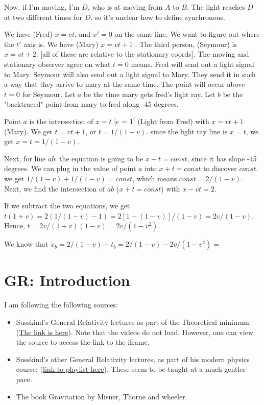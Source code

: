 \documentclass[11pt]{book}
\begin{document}
Now, if I'm moving, I'm $D$, who is at moving from $A$ to $B$. The light
reaches $D$ at two different times for $D$. so it's unclear how to define
synchronous.


We have (Fred) $x = vt$, and $x' = 0$ on the same line. We want to figure out
where the $t'$ axis is. We have (Mary) $x = vt + 1$ . The
third person, (Seymour) is $x = vt + 2$. [all of these are relative to the stationary coords].
The moving and stationary observer agree on what $t = 0$ means. Fred will
send out a light signal to Mary. Seymour will also send out a light signal
to Mary. They send it in such a way that they arrive to mary at the same
time. The point will occur above $t = 0$ for Seymour. Let $a$ be the
time mary gets fred's light ray. Let $b$ be the "backtraced" point from
mary to fred along -45 degrees.

Point $a$ is the intersection of $x = t$ [c = 1] (Light from Fred) 
with $x = vt + 1$ (Mary). We get $t = vt + 1$, or $t = 1/(1-v)$. since
the light ray line is $x = t$, we get $x = t = 1/(1-v)$.

Next, for line $ab$: the equation is going to be $x + t = const$, since it
has slope -45 degrees. We can plug in the value of point $a$ into $x +t = const$
to discover $const$. we get $1/(1-v) + 1/(1-v) = const$, which means
$const = 2/(1-v)$. Next, we find the intersection of $ab$ ($x+t = const$)
with $x - vt = 2$.

If we subtract the two equations, we get
$t(1+v) = 2(1/(1-v) - 1) = 2[1 - (1-v)]/(1-v) = 2v/(1-v)$.
Hence, $t = 2v/(1+v)(1-v) = 2v/(1-v^2)$.

We know that $x_b = 2/(1-v) - t_b = 2/(1-v) - 2v/(1-v^2) = $
\chapter{GR: Introduction}

I am following the following sources:

\begin{itemize}
    \item Susskind's General Relativity lectures as part of the Theoretical
        minimum: (\href{https://theoreticalminimum.com/courses/general-relativity/}{The link is here}).
        Note that the videos do not load. However, one can view the source to access the link
        to the iframe.
    \item Susskind's other General Relativity lectures, as part of his modern
        physics course: (\href{https://www.youtube.com/watch?v=hbmf0bB38h0&list=PL6C8BDEEBA6BDC78D}{link to playlist here}).
        These seem to be taught at a much gentler pace.
    \item The book Gravitation by Misner, Thorne and wheeler.
\end{itemize}
\end{document}
